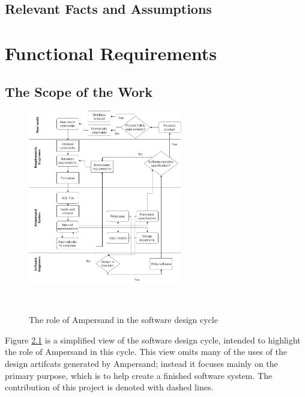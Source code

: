 \documentclass[12pt]{report}
\begin{document}
\section{Relevant Facts and Assumptions}\label{sec:Assumptions}

\chapter{Functional Requirements}\label{ch:Functional}
\section{The Scope of the Work}\label{sec:ScopeOfWork}

\begin{figure}[!htb]
\begin{center}
\includegraphics[width=0.6\textwidth]{../figures/business_process}
\caption{The role of Ampersand in the software design cycle}~\label{fig:BusinessProcess}
\end{center}
\end{figure}

Figure \ref{fig:BusinessProcess} is a simplified view of the software design
cycle, intended to highlight the role of Ampersand in this cycle. This view
omits many of the uses of the design artifcats generated by Ampersand; instead
it focuses mainly on the primary purpose, which is to help create a finished
software system. The contribution of this project is denoted with dashed lines.
\end{document}

